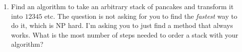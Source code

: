 \begin{enumerate}[leftmargin=*]
\begin{solution}
$$$$
$$
\begin{vmatrix} 6 \\ 3\\ 1\\ 4\\ 5\\ 2 \end{vmatrix}
\quad
\rightarrow
\quad 
\begin{vmatrix}1\\3\\6\\4\\5\\2 \end{vmatrix}
\quad
\rightarrow
\quad 
\begin{vmatrix}5\\4\\6\\3\\1\\2 \end{vmatrix}
\quad
\rightarrow
\quad 
\begin{vmatrix}4\\5\\6\\3\\1\\2 \end{vmatrix}
\quad
\rightarrow
\quad 
\begin{vmatrix}6\\5\\4\\3\\1\\2 \end{vmatrix}
\quad
\rightarrow
\quad 
\begin{vmatrix}2\\1\\3\\4\\5\\6\end{vmatrix}
\quad
\rightarrow
\quad 
\begin{vmatrix}1\\2\\3\\4\\5\\6 \end{vmatrix}
$$
We can refer to $P_6$ in order to discover the paths between the two states. \color{red}This isn't optimal, but the optimal one is really hard to find! Good work.\color{black}
\end{solution}
\item Find an algorithm to take an arbitrary stack of pancakes and transform it into $1 2 3 4 5$ etc. The question is not asking for you to find the \textit{fastest} way to do it, which is NP hard. I'm asking you to just find a method that always works. What is the most number of steps needed to order a stack with your algorithm? 


\end{enumerate}
